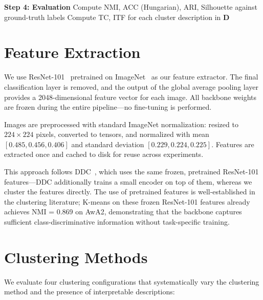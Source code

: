 \begin{algorithm}[H]
\begin{algorithmic}[1]
    \Statex
    \State \textbf{Step 4: Evaluation}
    \State Compute NMI, ACC (Hungarian), ARI, Silhouette against ground-truth labels
    \State Compute TC, ITF for each cluster description in $\mathbf{D}$
\end{algorithmic}
\end{algorithm}

\section{Feature Extraction}
\label{sec:feature_extraction}

We use ResNet-101~\citep{He2016} pretrained on ImageNet~\citep{Deng2009} as our feature extractor. The final classification layer is removed, and the output of the global average pooling layer provides a 2048-dimensional feature vector for each image. All backbone weights are frozen during the entire pipeline---no fine-tuning is performed.

Images are preprocessed with standard ImageNet normalization: resized to $224 \times 224$ pixels, converted to tensors, and normalized with mean $[0.485, 0.456, 0.406]$ and standard deviation $[0.229, 0.224, 0.225]$. Features are extracted once and cached to disk for reuse across experiments.

This approach follows DDC~\citep{Zhang2021}, which uses the same frozen, pretrained ResNet-101 features---DDC additionally trains a small encoder on top of them, whereas we cluster the features directly. The use of pretrained features is well-established in the clustering literature; K-means on these frozen ResNet-101 features already achieves NMI = 0.869 on AwA2, demonstrating that the backbone captures sufficient class-discriminative information without task-specific training.


\section{Clustering Methods}
\label{sec:clustering_methods}

We evaluate four clustering configurations that systematically vary the clustering method and the presence of interpretable descriptions:

